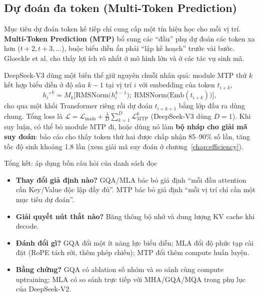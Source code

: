 \begin{center}
\label{fig:mla_comparison}
\end{center}

\subsection{Dự đoán đa token (Multi-Token Prediction)}
\label{ssec:mtp}

Mục tiêu dự đoán token kế tiếp chỉ cung cấp một tín hiệu học cho mỗi vị trí. \textbf{Multi-Token Prediction (MTP)} \cite{gloeckle2024mtp} bổ sung các “đầu” phụ dự đoán các token xa hơn ($t+2, t+3, \dots$), buộc biểu diễn ẩn phải “lập kế hoạch” trước vài bước. Gloeckle et al. cho thấy lợi ích rõ nhất ở mô hình lớn và ở các tác vụ sinh mã.

DeepSeek-V3 \cite{deepseekai2024v3} dùng một biến thể giữ nguyên chuỗi nhân quả: module MTP thứ $k$ kết hợp biểu diễn ở độ sâu $k-1$ tại vị trí $i$ với embedding của token $t_{i+k}$,
\[
h_i'^{\,k} = M_k\Big[\text{RMSNorm}\big(h_i^{k-1}\big);\ \text{RMSNorm}\big(\text{Emb}(t_{i+k})\big)\Big],
\]
cho qua một khối Transformer riêng rồi dự đoán $t_{i+k+1}$ bằng lớp đầu ra dùng chung. Tổng loss là $\mathcal{L} = \mathcal{L}_{\text{main}} + \frac{\lambda}{D}\sum_{k=1}^{D}\mathcal{L}^{k}_{\text{MTP}}$ (DeepSeek-V3 dùng $D = 1$). Khi suy luận, có thể bỏ module MTP đi, hoặc dùng nó làm \textbf{bộ nháp cho giải mã suy đoán}: báo cáo cho thấy token thứ hai được chấp nhận 85--90\% số lần, tăng tốc độ sinh khoảng 1.8 lần (xem giải mã suy đoán ở chương~\ref{chap:efficiency}).

\begin{assess}{Tổng kết: áp dụng bốn câu hỏi của danh sách đọc}
\begin{itemize}
	\item \textbf{Thay đổi giả định nào?} GQA/MLA bác bỏ giả định “mỗi đầu attention cần Key/Value độc lập đầy đủ”. MTP bác bỏ giả định “mỗi vị trí chỉ cần một mục tiêu dự đoán”.
	\item \textbf{Giải quyết nút thắt nào?} Băng thông bộ nhớ và dung lượng KV cache khi decode.
	\item \textbf{Đánh đổi gì?} GQA đổi một ít năng lực biểu diễn; MLA đổi độ phức tạp cài đặt (RoPE tách rời, thêm phép chiếu); MTP đổi thêm compute huấn luyện.
	\item \textbf{Bằng chứng?} GQA có ablation số nhóm và so sánh cùng compute uptraining; MLA có so sánh trực tiếp với MHA/GQA/MQA trong phụ lục của DeepSeek-V2.
\end{itemize}
\end{assess}

